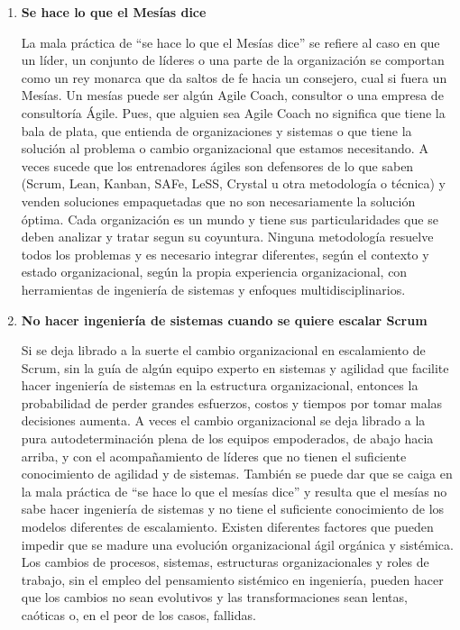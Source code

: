 \begin{enumerate}
\item \textbf{Se hace lo que el Mesías dice}

La mala práctica de “se hace lo que el Mesías dice” se refiere al caso en que un líder, un conjunto de líderes o una parte de la organización se comportan como un rey monarca que da saltos de fe hacia un consejero, cual si fuera un Mesías. Un mesías puede ser algún Agile Coach, consultor o una empresa de consultoría Ágile. Pues, que alguien sea Agile Coach no significa que tiene la bala de plata, que entienda de organizaciones y sistemas o que tiene la solución al problema o cambio organizacional que estamos necesitando. A veces sucede que los entrenadores ágiles son defensores de lo que saben (Scrum, Lean, Kanban, SAFe, LeSS, Crystal u otra metodología o técnica) y venden soluciones empaquetadas que no son necesariamente la solución óptima. Cada organización es un mundo y tiene sus particularidades que se deben analizar y tratar segun su coyuntura. Ninguna metodología resuelve todos los problemas y es necesario integrar diferentes, según el contexto y estado organizacional, según la propia experiencia organizacional, con herramientas de ingeniería de sistemas y enfoques multidisciplinarios.

\item \textbf{No hacer ingeniería de sistemas cuando se quiere escalar Scrum}

Si se deja librado a la suerte el cambio organizacional en escalamiento de Scrum, sin la guía de algún equipo experto en sistemas y agilidad que facilite hacer ingeniería de sistemas en la estructura organizacional, entonces la probabilidad de perder grandes esfuerzos, costos y tiempos por tomar malas decisiones aumenta. A veces el cambio organizacional se deja librado a la pura autodeterminación plena de los equipos empoderados, de abajo hacia arriba, y con el acompañamiento de líderes que no tienen el suficiente conocimiento de agilidad y de sistemas. También se puede dar que se caiga en la mala práctica de “se hace lo que el mesías dice” y resulta que el mesías no sabe hacer ingeniería de sistemas y no tiene el suficiente conocimiento de los modelos diferentes de escalamiento. Existen diferentes factores que pueden impedir que se madure una evolución organizacional ágil orgánica y sistémica. Los cambios de procesos, sistemas, estructuras organizacionales y roles de trabajo, sin el empleo del pensamiento sistémico en ingeniería, pueden hacer que los cambios no sean evolutivos y las transformaciones sean lentas, caóticas o, en el peor de los casos, fallidas. 

\end{enumerate}



